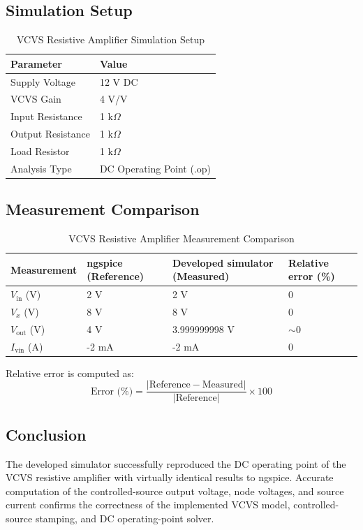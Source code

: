 \subsection{Simulation Setup}
\begin{table}[H]
\centering
\caption{VCVS Resistive Amplifier Simulation Setup}
\label{tab:vcvs_setup}
\begin{tabular}{ll}
\toprule
\textbf{Parameter} & \textbf{Value} \\
\midrule
Supply Voltage    & 12 V DC \\
VCVS Gain         & 4 V/V \\
Input Resistance  & 1 k$\Omega$ \\
Output Resistance & 1 k$\Omega$ \\
Load Resistor     & 1 k$\Omega$ \\
Analysis Type     & DC Operating Point (.op) \\
\bottomrule
\end{tabular}
\end{table}

\subsection{Measurement Comparison}
\begin{table}[H]
\centering
\caption{VCVS Resistive Amplifier Measurement Comparison}
\label{tab:vcvs_comparison}
\begin{tabular}{llll}
\toprule
\textbf{Measurement} & \textbf{ngspice (Reference)} & \textbf{Developed simulator (Measured)} & \textbf{Relative error (\%)} \\
\midrule
$V_{\text{in}}$ (V)  & 2 V   & 2 V           & 0 \\
$V_x$ (V)            & 8 V   & 8 V           & 0 \\
$V_{\text{out}}$ (V) & 4 V   & 3.999999998 V & $\sim$0 \\
$I_{\text{vin}}$ (A) & -2 mA & -2 mA         & 0 \\
\bottomrule
\end{tabular}
\end{table}

Relative error is computed as: 
\begin{equation}
\text{Error (\%)} = \frac{|\text{Reference} - \text{Measured}|}{|\text{Reference}|} \times 100
\end{equation}

\subsection{Conclusion}
The developed simulator successfully reproduced the DC operating point of the VCVS resistive amplifier with virtually identical results to ngspice. Accurate computation of the controlled-source output voltage, node voltages, and source current confirms the correctness of the implemented VCVS model, controlled-source stamping, and DC operating-point solver.

